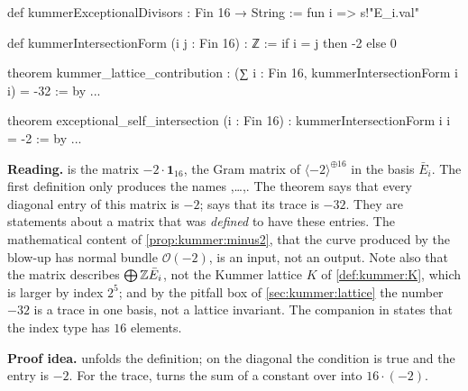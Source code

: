 \begin{leanbox}
\begin{leancode}
def kummerExceptionalDivisors : Fin 16 → String :=
  fun i => s!"E_{i.val}"

def kummerIntersectionForm (i j : Fin 16) : ℤ :=
  if i = j then -2 else 0

theorem kummer_lattice_contribution :
    (∑ i : Fin 16, kummerIntersectionForm i i) = -32 := by ...

theorem exceptional_self_intersection (i : Fin 16) :
    kummerIntersectionForm i i = -2 := by ...
\end{leancode}
\textbf{Reading.}  is the matrix $-2\cdot\mathbf 1_{16}$, the
Gram matrix of $\langle-2\rangle^{\oplus16}$ in the basis $\bar E_i$. The first definition
only produces the names ,\dots,. The theorem
 says that every diagonal entry of this matrix is $-2$;
 says that its trace is $-32$. They are statements about
a matrix that was \emph{defined} to have these entries. The mathematical content of
\cref{prop:kummer:minus2}, that the curve produced by the blow-up has normal bundle
$\mathcal{O}(-2)$, is an input, not an output. Note also that the matrix describes
$\bigoplus\mathbb{Z}\bar E_i$, not the Kummer lattice $K$ of \cref{def:kummer:K}, which is larger by
index $2^5$; and by the pitfall box of \cref{sec:kummer:lattice} the number $-32$ is a trace in
one basis, not a lattice invariant. The companion  in
 states that the index type  has $16$ elements.

\textbf{Proof idea.}  unfolds the definition; on the diagonal the condition
 is true and the entry is $-2$. For the trace,  turns the
sum of a constant over  into $16\cdot(-2)$.
\end{leanbox}

